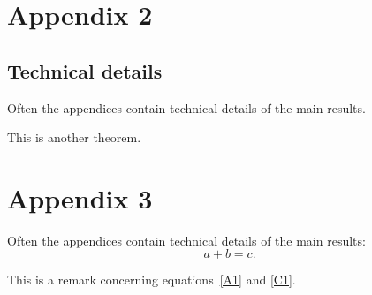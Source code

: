 \documentclass[lineno]{biometrika}
\begin{document}
\appendixtwo
\section*{Appendix 2}
\subsection*{Technical details}

Often the appendices contain technical details of the main results.

\begin{theorem}
This is another theorem.
\end{theorem}

\appendixthree
\section*{Appendix 3}

Often the appendices contain technical details of the main results:
\begin{equation}
\label{C1}
a + b = c.
\end{equation}

\begin{remark}
This is a remark concerning equations~\eqref{A1} and \eqref{C1}.
\end{remark}

%
%
\end{document}
